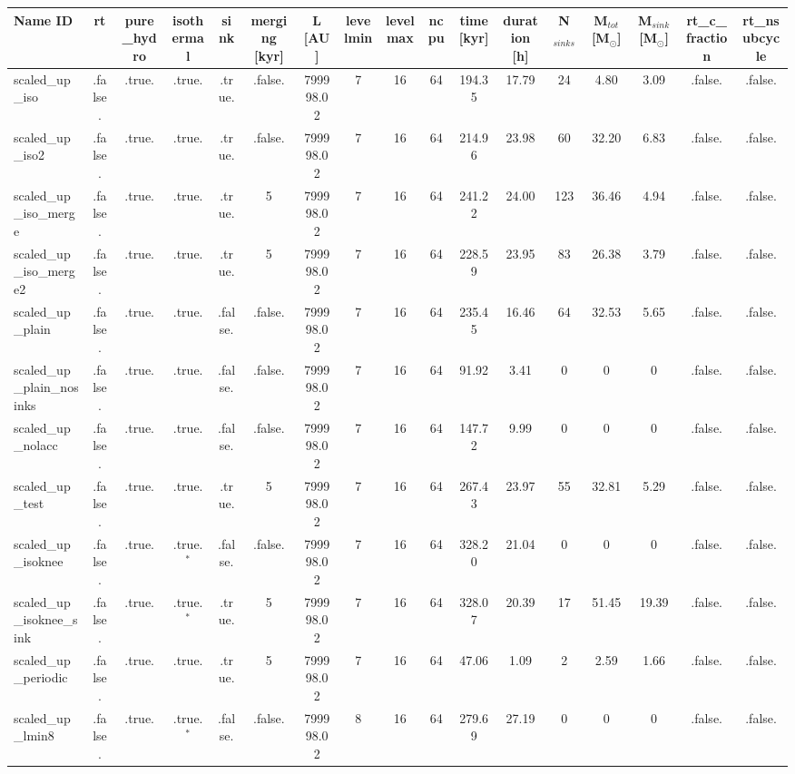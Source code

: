 \begin{table}
\begin{adjustbox}{width=1.8\textheight}
\begin{tabular}{lcccccccccccccccc}
\toprule
Name ID & rt & pure\_hydro & isothermal & sink & merging [kyr] & L [AU] & levelmin & levelmax & ncpu & time [kyr] & duration [h] & N$_{sinks}$ & M$_{tot}$ [M$_{\odot}$] & M$_{sink}$ [M$_{\odot}$] & rt\_c\_fraction & rt\_nsubcycle \\
\midrule
scaled\_up\_iso & .false. & .true. & .true. & .true. & .false. & 799998.02 & 7 & 16 & 64 & 194.35 & 17.79 & 24 & 4.80 & 3.09 & .false. & .false. \\
scaled\_up\_iso2 & .false. & .true. & .true. & .true. & .false. & 799998.02 & 7 & 16 & 64 & 214.96 & 23.98 & 60 & 32.20 & 6.83 & .false. & .false. \\
scaled\_up\_iso\_merge & .false. & .true. & .true. & .true. & 5 & 799998.02 & 7 & 16 & 64 & 241.22 & 24.00 & 123 & 36.46 & 4.94 & .false. & .false. \\
scaled\_up\_iso\_merge2 & .false. & .true. & .true. & .true. & 5 & 799998.02 & 7 & 16 & 64 & 228.59 & 23.95 & 83 & 26.38 & 3.79 & .false. & .false. \\
scaled\_up\_plain & .false. & .true. & .true. & .false. & .false. & 799998.02 & 7 & 16 & 64 & 235.45 & 16.46 & 64 & 32.53 & 5.65 & .false. & .false. \\
scaled\_up\_plain\_nosinks & .false. & .true. & .true. & .false. & .false. & 799998.02 & 7 & 16 & 64 & 91.92 & 3.41 & 0 & 0 & 0 & .false. & .false. \\
scaled\_up\_nolacc & .false. & .true. & .true. & .false. & .false. & 799998.02 & 7 & 16 & 64 & 147.72 & 9.99 & 0 & 0 & 0 & .false. & .false. \\
scaled\_up\_test & .false. & .true. & .true. & .true. & 5 & 799998.02 & 7 & 16 & 64 & 267.43 & 23.97 & 55 & 32.81 & 5.29 & .false. & .false. \\
scaled\_up\_isoknee & .false. & .true. & .true.$^{\ast}$ & .false. & .false. & 799998.02 & 7 & 16 & 64 & 328.20 & 21.04 & 0 & 0 & 0 & .false. & .false. \\
scaled\_up\_isoknee\_sink & .false. & .true. & .true.$^{\ast}$ & .true. & 5 & 799998.02 & 7 & 16 & 64 & 328.07 & 20.39 & 17 & 51.45 & 19.39 & .false. & .false. \\
scaled\_up\_periodic & .false. & .true. & .true. & .true. & 5 & 799998.02 & 7 & 16 & 64 & 47.06 & 1.09 & 2 & 2.59 & 1.66 & .false. & .false. \\
scaled\_up\_lmin8 & .false. & .true. & .true.$^{\ast}$ & .false. & .false. & 799998.02 & 8 & 16 & 64 & 279.69 & 27.19 & 0 & 0 & 0 & .false. & .false. \\

\end{tabular}
\end{adjustbox}
\end{table}
